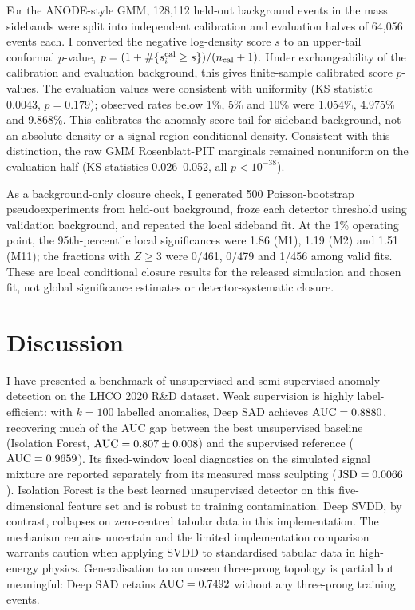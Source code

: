 \documentclass[11pt,a4paper]{article}
\newcommand{\subhead}[1]{\par\vspace{4pt}{\sffamily\bfseries\normalsize #1}\par\nopagebreak\vspace{1pt}}
\newcommand{\klabels}{k}
\newcommand{\auc}{\mathrm{AUC}}
\newcommand{\jsd}{\mathrm{JSD}}
\begin{document}
\subhead{Density-score calibration and background-only closure}
For the ANODE-style GMM, 128,112 held-out background events in the mass sidebands were
split into independent calibration and evaluation halves of 64,056 events each. I
converted the negative log-density score $s$ to an upper-tail conformal $p$-value,
$p=(1+\#\{s_i^{\rm cal}\geq s\})/(n_{\rm cal}+1)$. Under exchangeability of the
calibration and evaluation background, this gives finite-sample calibrated score
$p$-values.\cite{ShaferVovk2008} The evaluation values were consistent with uniformity
(KS statistic 0.0043, $p=0.179$); observed rates below 1\%, 5\% and 10\% were 1.054\%,
4.975\% and 9.868\%. This calibrates the anomaly-score tail for sideband background,
not an absolute density or a signal-region conditional density. Consistent with this
distinction, the raw GMM Rosenblatt-PIT marginals remained nonuniform on the evaluation
half (KS statistics 0.026--0.052, all $p<10^{-38}$).

As a background-only closure check, I generated 500 Poisson-bootstrap pseudoexperiments
from held-out background, froze each detector threshold using validation background,
and repeated the local sideband fit. At the 1\% operating point, the 95th-percentile
local significances were 1.86 (M1), 1.19 (M2) and 1.51 (M11); the fractions with
$Z\geq3$ were 0/461, 0/479 and 1/456 among valid fits. These are local conditional
closure results for the released simulation and chosen fit, not global significance
estimates or detector-systematic closure.

\section{Discussion}

I have presented a benchmark of unsupervised and semi-supervised
anomaly detection on the LHCO 2020 R\&D dataset. Weak supervision is
highly label-efficient: with $\klabels = 100$ labelled anomalies, Deep SAD
achieves $\auc = \SADMean$, recovering much of the AUC gap between the best
unsupervised baseline (Isolation Forest, $\auc = \IFHeadline$) and the
supervised reference ($\auc = \SupMean$). Its fixed-window local diagnostics on
the simulated signal mixture are reported separately from its measured
mass sculpting ($\jsd = \SADJSD$). Isolation Forest is the best learned
unsupervised detector on this five-dimensional feature set and is robust
to training contamination. Deep SVDD, by contrast, collapses on zero-centred
tabular data in this implementation. The mechanism remains uncertain and
the limited implementation comparison warrants caution when
applying SVDD to standardised tabular data in high-energy physics. Generalisation
to an unseen three-prong topology is partial but meaningful: Deep SAD
retains $\auc = \SADTransferMean$ without any three-prong training events.
\end{document}

